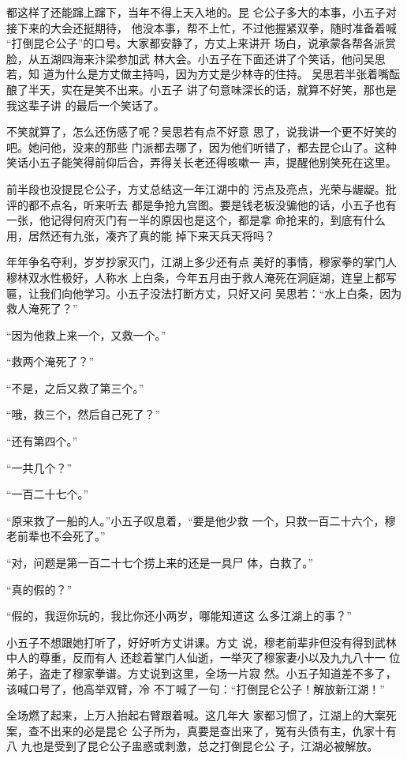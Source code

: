 都这样了还能蹿上蹿下，当年不得上天入地的。昆
仑公子多大的本事，小五子对接下来的大会还挺期待，
他没本事，帮不上忙，不过他握紧双拳，随时准备着喊
“打倒昆仑公子”的口号。大家都安静了，方丈上来讲开
场白，说承蒙各帮各派赏脸，从五湖四海来汴梁参加武
林大会。小五子在下面还讲了个笑话，他问吴思若，知
道为什么是方丈做主持吗，因为方丈是少林寺的住持。
吴思若半张着嘴酝酿了半天，实在是笑不出来。小五子
讲了句意味深长的话，就算不好笑，那也是我这辈子讲
的最后一个笑话了。

不笑就算了，怎么还伤感了呢？吴思若有点不好意
思了，说我讲一个更不好笑的吧。她问他，没来的那些
门派都去哪了，因为他们听错了，都去昆仑山了。这种
笑话小五子能笑得前仰后合，弄得关长老还得咳嗽一
声，提醒他别笑死在这里。

前半段也没提昆仑公子，方丈总结这一年江湖中的
污点及亮点，光荣与龌龊。批评的都不点名，听来听去
都是争抢九宫图。要是钱老板没骗他的话，小五子也有
一张，他记得何府灭门有一半的原因也是这个，都是拿
命抢来的，到底有什么用，居然还有九张，凑齐了真的能
掉下来天兵天将吗？

年年争名夺利，岁岁抄家灭门，江湖上多少还有点
美好的事情，穆家拳的掌门人穆林双水性极好，人称水
上白条，今年五月由于救人淹死在洞庭湖，连皇上都写
匾，让我们向他学习。小五子没法打断方丈，只好又问
吴思若：“水上白条，因为救人淹死了？”

“因为他救上来一个，又救一个。”

“救两个淹死了？”

“不是，之后又救了第三个。”

“哦，救三个，然后自己死了？”

“还有第四个。”

“一共几个？”

“一百二十七个。”

“原来救了一船的人。”小五子叹息着，“要是他少救
一个，只救一百二十六个，穆老前辈也不会死了。”

“对，问题是第一百二十七个捞上来的还是一具尸
体，白救了。”

“真的假的？”

“假的，我逗你玩的，我比你还小两岁，哪能知道这
么多江湖上的事？”

小五子不想跟她打听了，好好听方丈讲课。方丈
说，穆老前辈非但没有得到武林中人的尊重，反而有人
还趁着掌门人仙逝，一举灭了穆家妻小以及九九八十一
位弟子，盗走了穆家拳谱。方丈说到这里，全场一片寂
然。小五子知道差不多了，该喊口号了，他高举双臂，冷
不丁喊了一句：“打倒昆仑公子！解放新江湖！”

全场燃了起来，上万人抬起右臂跟着喊。这几年大
家都习惯了，江湖上的大案死案，查不出来的必是昆仑
公子所为，真要是查出来了，冤有头债有主，仇家十有八
九也是受到了昆仑公子盅惑或刺激，总之打倒昆仑公
子，江湖必被解放。

